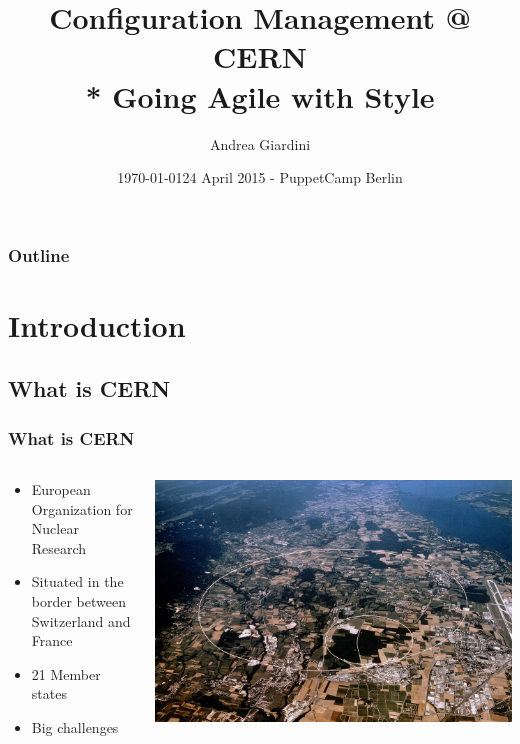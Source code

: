 \documentclass[aspectratio=169]{beamer}
\title[Configuration Management @ CERN]{Configuration Management @ CERN\\*
    Going Agile with Style}
\author{Andrea Giardini}
\date{\today}
\institute[CERN]
{
CERN \\
\medskip
\textit{andrea.giardini@cern.ch}
}
\date{24 April 2015 - PuppetCamp Berlin}
\begin{document}
\cernSplashBlue

\begin{frame}
\titlepage
\end{frame}

\begin{frame}
\frametitle{Outline}
\tableofcontents
\end{frame}


\section{Introduction}

\subsection{What is CERN}

\begin{frame}

    \frametitle{What is CERN}
    \begin{minipage}[t]{0.95\textwidth}
        \begin{columns}
            \begin{column}{0.5\textwidth}
                \begin{itemize}
                    \item European Organization for Nuclear Research
                    \item Situated in the border between Switzerland and France
                    \item 21 Member states
                    \item Big challenges 
                \end{itemize}
            \end{column}
            \begin{column}{0.5\textwidth}
                \includegraphics[width=1.1\textwidth]{CernMap.jpg}
            \end{column}
        \end{columns}
    \end{minipage}

\end{frame}
\end{document}
